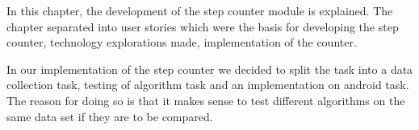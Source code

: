 In this chapter, the development of the step counter module is explained. The chapter separated into user stories which were the basis for developing the step counter, technology explorations made, implementation of the counter.

In our implementation of the step counter we decided to split the task into a data collection task, testing of algorithm task and an implementation on android task. The reason for doing so is that it makes sense to test different algorithms on the same data set if they are to be compared.